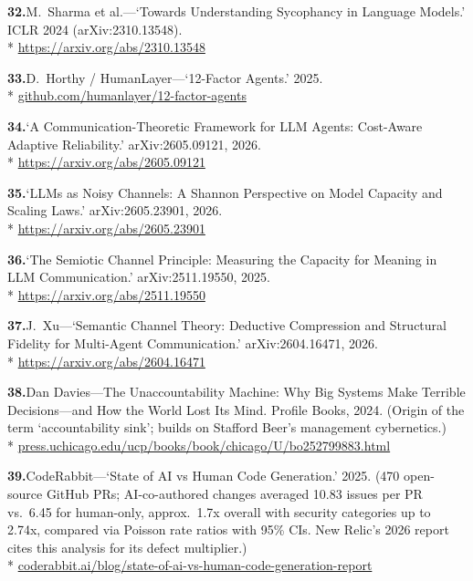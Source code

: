 \documentclass[11pt, a4paper]{article}
\begin{document}
\noindent\textbf{32.}\enspace M.~Sharma et al.---`Towards Understanding Sycophancy in
Language Models.' ICLR 2024 (arXiv:2310.13548).\\*
{\fontsize{8}{10}\selectfont\color{midb}
\href{https://arxiv.org/abs/2310.13548}{https://arxiv.org/abs/2310.13548}}


\noindent\textbf{33.}\enspace D.~Horthy / HumanLayer---`12-Factor Agents.' 2025.\\*
{\fontsize{8}{10}\selectfont\color{midb}
\href{https://github.com/humanlayer/12-factor-agents}{github.com/humanlayer/12-factor-agents}}


\noindent\textbf{34.}\enspace `A Communication-Theoretic Framework for LLM Agents:
Cost-Aware Adaptive Reliability.' arXiv:2605.09121, 2026.\\*
{\fontsize{8}{10}\selectfont\color{midb}
\href{https://arxiv.org/abs/2605.09121}{https://arxiv.org/abs/2605.09121}}


\noindent\textbf{35.}\enspace `LLMs as Noisy Channels: A Shannon Perspective on Model
Capacity and Scaling Laws.' arXiv:2605.23901, 2026.\\*
{\fontsize{8}{10}\selectfont\color{midb}
\href{https://arxiv.org/abs/2605.23901}{https://arxiv.org/abs/2605.23901}}


\noindent\textbf{36.}\enspace `The Semiotic Channel Principle: Measuring the Capacity for
Meaning in LLM Communication.' arXiv:2511.19550, 2025.\\*
{\fontsize{8}{10}\selectfont\color{midb}
\href{https://arxiv.org/abs/2511.19550}{https://arxiv.org/abs/2511.19550}}


\noindent\textbf{37.}\enspace J.~Xu---`Semantic Channel Theory: Deductive Compression and
Structural Fidelity for Multi-Agent Communication.' arXiv:2604.16471, 2026.\\*
{\fontsize{8}{10}\selectfont\color{midb}
\href{https://arxiv.org/abs/2604.16471}{https://arxiv.org/abs/2604.16471}}


\noindent\textbf{38.}\enspace Dan Davies---The Unaccountability Machine: Why Big Systems
Make Terrible Decisions---and How the World Lost Its Mind. Profile Books, 2024. (Origin of
the term `accountability sink'; builds on Stafford Beer's management cybernetics.)\\*
{\fontsize{8}{10}\selectfont\color{midb}
\href{https://press.uchicago.edu/ucp/books/book/chicago/U/bo252799883.html}{press.uchicago.edu/ucp/books/book/chicago/U/bo252799883.html}}


\noindent\textbf{39.}\enspace CodeRabbit---`State of AI vs Human Code Generation.' 2025.
(470 open-source GitHub PRs; AI-co-authored changes averaged 10.83 issues per PR vs.\ 6.45
for human-only, approx.\ 1.7x overall with security categories up to 2.74x, compared via
Poisson rate ratios with 95\% CIs. New Relic's 2026 report cites this analysis for its
defect multiplier.)\\*
{\fontsize{8}{10}\selectfont\color{midb}
\href{https://coderabbit.ai/blog/state-of-ai-vs-human-code-generation-report}{coderabbit.ai/blog/state-of-ai-vs-human-code-generation-report}}
\end{document}

